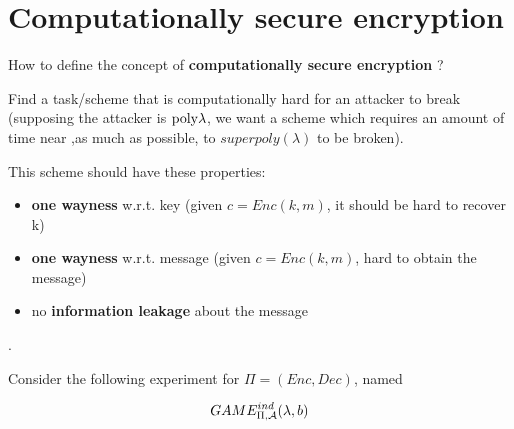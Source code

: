 
\section{Computationally secure encryption}

\begin{question}
    How to define the concept of \textbf{computationally secure encryption} ?    
\end{question}

Find a task/scheme that is computationally hard for an attacker to break
(supposing the attacker is $ \mathrm{poly}{\lambda} $, we want a scheme which requires
an amount of time near ,as much as possible, to $superpoly(\lambda)$ to be
broken).

This scheme should have these properties:
\begin{itemize}
    \item \label{prop:owk} \textbf{one wayness} w.r.t. key (given $c=Enc(k,m)$,
        it should be hard to recover k) 
    \item \label{prop:owm} \textbf{one wayness}  w.r.t. message (given
        $c=Enc(k,m)$, hard to obtain the message)
    \item \label{prop:nol} no \textbf{information leakage} about the message
\end{itemize}.

Consider the following experiment for $\Pi=(Enc, Dec)$, named 

\[
    GAME_{\Pi, \mathcal{A}}^{ind}(\lambda, b)
\]


\begin{figure}[h!]
   \centering
   \sdinit{}
   \caption{}
   \label{fig:knowmess}
\end{figure}


